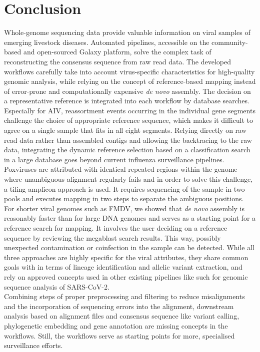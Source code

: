 \chapter{Conclusion}\label{chap:conclusion}
Whole-genome sequencing data provide valuable information on viral samples of emerging livestock diseases. Automated pipelines, accessible on the community-based and open-sourced Galaxy platform, solve the complex task of reconstructing the consensus sequence from raw read data. The developed workflows carefully take into account virus-specific characteristics for high-quality genomic analysis, while relying on the concept of reference-based mapping instead of error-prone and computationally expensive \textit{de novo} assembly. The decision on a representative reference is integrated into each workflow by database searches. Especially for \ac{AIV}, reassortment events occurring in the individual gene segments challenge the choice of appropriate reference sequence, which makes it difficult to agree on a single sample that fits in all eight segments. Relying directly on raw read data rather than assembled contigs and allowing the backtracing to the raw data, integrating the dynamic reference selection based on a classification search in a large database goes beyond current influenza surveillance pipelines.\\
Poxviruses are attributed with identical repeated regions within the genome where unambiguous alignment regularly fails and in order to solve this challenge, a tiling amplicon approach is used. It requires sequencing of the sample in two pools and executes mapping in two steps to separate the ambiguous positions.\\
For shorter viral genomes such as \ac{FMDV}, we showed that \textit{de novo} assembly is reasonably faster than for large \ac{DNA} genomes and serves as a starting point for a reference search for mapping. It involves the user deciding on a reference sequence by reviewing the megablast search results. This way, possibly unexpected contamination or coinfection in the sample can be detected. While all three approaches are highly specific for the viral attributes, they share common goals with in terms of lineage identification and allelic variant extraction, and rely on approved concepts used in other existing pipelines like such for genomic sequence analysis of \ac{SARS-CoV-2}.\\
Combining steps of proper preprocessing and filtering to reduce misalignments and the incorporation of sequencing errors into the alignment, downstream analysis based on alignment files and consensus sequence like variant calling, phylogenetic embedding and gene annotation are missing concepts in the workflows. Still, the workflows serve as starting points for more, specialised surveillance efforts.
